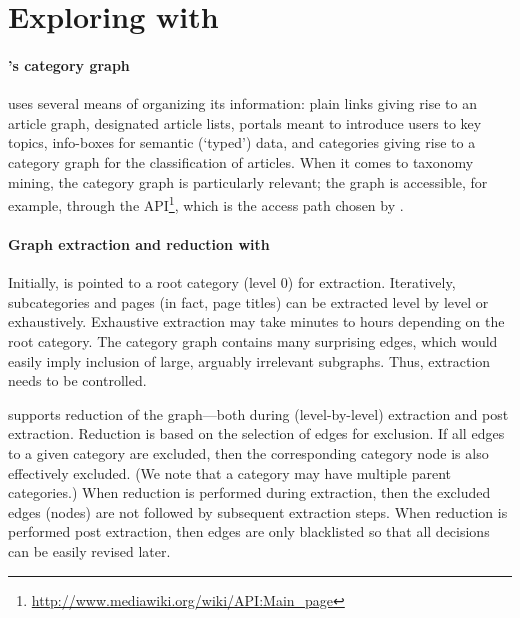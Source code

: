 
\section{Exploring \Wikipedia{} with \WikiTax} 
\label{S:tool}

\paragraph*{\textbf{\Wikipedia's category graph}}

\Wikipedia{} uses several means of organizing its information: plain links giving rise to an article graph, designated article lists, portals meant to introduce users to key topics, info-boxes for semantic (`typed') data, and categories giving rise to a category graph for the classification of articles. When it comes to taxonomy mining, the category graph is particularly relevant; the graph is accessible, for example, through the \MediaWiki{} API\footnote{\url{http://www.mediawiki.org/wiki/API:Main_page}}, which is the access path chosen by \WikiTax.


\paragraph*{\textbf{Graph extraction and reduction with \WikiTax}}

Initially, \WikiTax{} is pointed to a root category (level 0) for
extraction. Iteratively, subcategories and pages (in fact, page
titles) can be extracted level by level or exhaustively. Exhaustive
extraction may take minutes to hours depending on the root
category. The \Wikipedia{} category graph contains many surprising
edges, which would easily imply inclusion of large, arguably
irrelevant subgraphs. Thus, extraction needs to be controlled.

\WikiTax{} supports reduction of the graph---both during
(level-by-level) extraction and post extraction. Reduction is based on
the selection of edges for exclusion. If all edges to a given category
are excluded, then the corresponding category node is also effectively
excluded. (We note that a category may have multiple parent
categories.) When reduction is performed during extraction, then the
excluded edges (nodes) are not followed by subsequent extraction
steps. When reduction is performed post extraction, then edges are
only blacklisted so that all decisions can be easily revised later.

